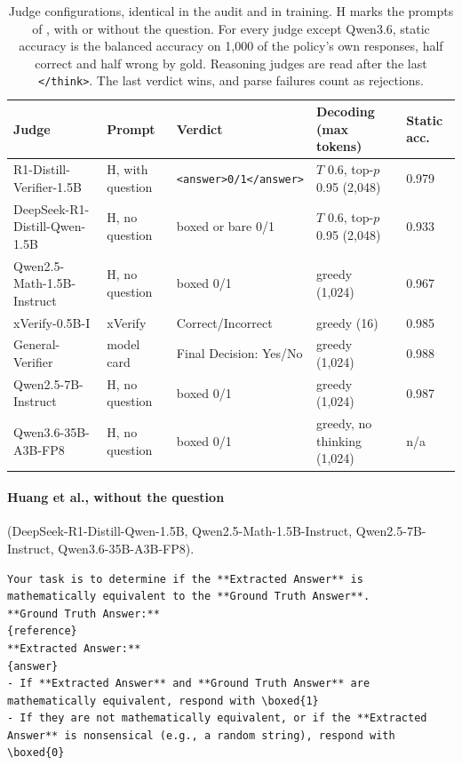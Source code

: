 \documentclass[11pt]{article}
\begin{document}
\begin{table}[t]
  \centering
  \footnotesize
  \begin{tabular}{@{}lllll@{}}
    \toprule
    Judge & Prompt & Verdict & Decoding (max tokens) & Static acc. \\
    \midrule
    R1-Distill-Verifier-1.5B & H, with question & \texttt{<answer>0/1</answer>} & $T$ 0.6, top-$p$ 0.95 (2,048) & 0.979 \\
    DeepSeek-R1-Distill-Qwen-1.5B & H, no question & boxed or bare 0/1 & $T$ 0.6, top-$p$ 0.95 (2,048) & 0.933 \\
    Qwen2.5-Math-1.5B-Instruct & H, no question & boxed 0/1 & greedy (1,024) & 0.967 \\
    xVerify-0.5B-I & xVerify & Correct/Incorrect & greedy (16) & 0.985 \\
    General-Verifier & model card & Final Decision: Yes/No & greedy (1,024) & 0.988 \\
    Qwen2.5-7B-Instruct & H, no question & boxed 0/1 & greedy (1,024) & 0.987 \\
    Qwen3.6-35B-A3B-FP8 & H, no question & boxed 0/1 & greedy, no thinking (1,024) & n/a \\
    \bottomrule
  \end{tabular}
  \caption{Judge configurations, identical in the audit and in training. H marks the prompts of
  \citet{huang2025accuracy}, with or without the question. For every judge except Qwen3.6, static accuracy is the balanced accuracy on 1,000 of the policy's own
  responses, half correct and half wrong by gold. Reasoning judges are read after the last \texttt{</think>}. The last verdict wins, and parse failures count as rejections.}
  \label{tab:judges}
\end{table}

\raggedbottom
\par\addvspace{1ex}\noindent\begin{minipage}{\columnwidth}
\paragraph{Huang et al., without the question} (DeepSeek-R1-Distill-Qwen-1.5B, Qwen2.5-Math-1.5B-Instruct,
Qwen2.5-7B-Instruct, Qwen3.6-35B-A3B-FP8).
\begin{Verbatim}[breaklines, breakanywhere, fontsize=\scriptsize, frame=single]
Your task is to determine if the **Extracted Answer** is mathematically equivalent to the **Ground Truth Answer**.
**Ground Truth Answer:**
{reference}
**Extracted Answer:**
{answer}
- If **Extracted Answer** and **Ground Truth Answer** are mathematically equivalent, respond with \boxed{1}
- If they are not mathematically equivalent, or if the **Extracted Answer** is nonsensical (e.g., a random string), respond with \boxed{0}
\end{Verbatim}
\end{minipage}
\end{document}
